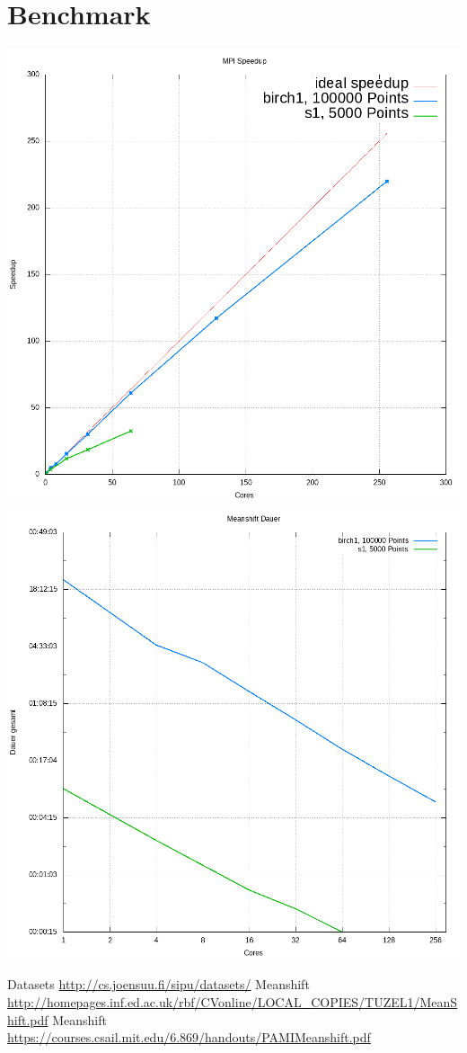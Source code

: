 \section{Benchmark}
\includegraphics[scale=0.61]{../meanshift/output/pics/speedup.png} 
\newpage
\includegraphics[scale=0.61]{../meanshift/output/pics/benchmark.png} 
\begin{thebibliography}{999}
	\bibitem [0] {} Datasets \url{http://cs.joensuu.fi/sipu/datasets/}
	\bibitem [1] {} Meanshift \url{http://homepages.inf.ed.ac.uk/rbf/CVonline/LOCAL_COPIES/TUZEL1/MeanShift.pdf}
	\bibitem [1] {} Meanshift \url{https://courses.csail.mit.edu/6.869/handouts/PAMIMeanshift.pdf}
	\newline
\end{thebibliography}
